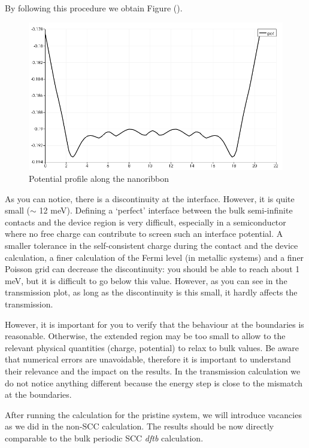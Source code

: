 \documentclass[a4paper,11pt,english]{sphinxmanual}
\begin{document}
{{By following this procedure we obtain Figure {\hyperref[transport:fig-plotline-pot]{\emph{}}} ().
\begin{figure}[htbp]
\centering
\capstart
\includegraphics[width=0.700\linewidth]{plotline_pot.png}
\caption{Potential profile along the nanoribbon}\label{transport:fig-plotline-pot}\end{figure}

As you can notice, there is a discontinuity at the interface. However,
it is quite small ($\sim$ 12 meV). Defining a `perfect' interface between
the bulk semi-infinite contacts and the device region is very
difficult, especially in a semiconductor where no free charge can
contribute to screen such an interface potential. A smaller tolerance
in the self-consistent charge during the contact and the device
calculation, a finer calculation of the Fermi level (in metallic
systems) and a finer Poisson grid can decrease the discontinuity: you
should be able to reach about 1 meV, but it is difficult to go below
this value. However, as you can see in the transmission plot, as long
as the discontinuity is this small, it hardly affects the
transmission.

However, it is important for you to verify that the behaviour at the
boundaries is reasonable. Otherwise, the extended region may be too
small to allow to the relevant physical quantities (charge, potential)
to relax to bulk values. Be aware that numerical errors are
unavoidable, therefore it is important to understand their relevance
and the impact on the results. In the transmission calculation we do
not notice anything different because the energy step is close to the
mismatch at the boundaries.

After running the calculation for the pristine system, we will
introduce vacancies as we did in the non-SCC calculation. The results
should be now directly comparable to the bulk periodic SCC \emph{dftb}
calculation.


}}
\end{document}
